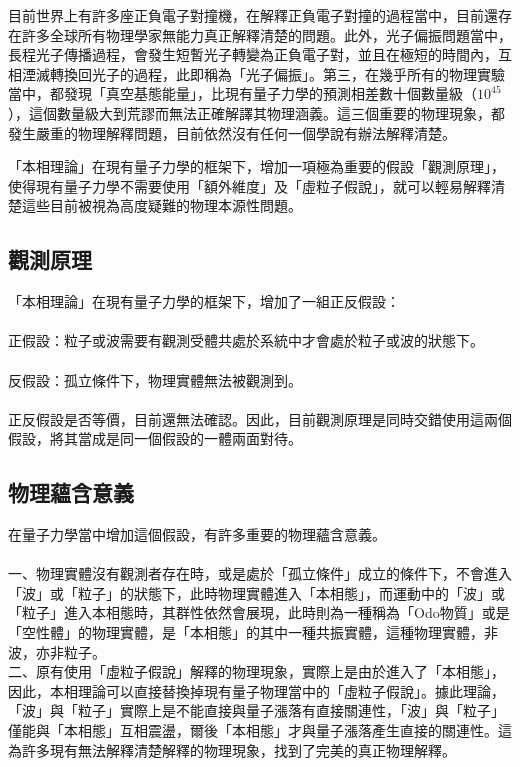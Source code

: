 \documentclass[a4paper,notitlepage,UTF8]{ctexart}
\begin{document}
目前世界上有許多座正負電子對撞機，在解釋正負電子對撞的過程當中，目前還存在許多全球所有物理學家無能力真正解釋清楚的問題。此外，光子偏振問題當中，長程光子傳播過程，會發生短暫光子轉變為正負電子對，並且在極短的時間內，互相湮滅轉換回光子的過程，此即稱為「光子偏振」。第三，在幾乎所有的物理實驗當中，都發現「真空基態能量」，比現有量子力學的預測相差數十個數量級（$10^{45}$），這個數量級大到荒謬而無法正確解譯其物理涵義。這三個重要的物理現象，都發生嚴重的物理解釋問題，目前依然沒有任何一個學說有辦法解釋清楚。

「本相理論」在現有量子力學的框架下，增加一項極為重要的假設「觀測原理」，使得現有量子力學不需要使用「額外維度」及「虛粒子假說」，就可以輕易解釋清楚這些目前被視為高度疑難的物理本源性問題。

\subsection{觀測原理}

「本相理論」在現有量子力學的框架下，增加了一組正反假設：
\\
\\
正假設：粒子或波需要有觀測受體共處於系統中才會處於粒子或波的狀態下。
\\
\\
反假設：孤立條件下，物理實體無法被觀測到。
\\
\\
正反假設是否等價，目前還無法確認。因此，目前觀測原理是同時交錯使用這兩個假設，將其當成是同一個假設的一體兩面對待。
\\

\subsection{物理蘊含意義}

在量子力學當中增加這個假設，有許多重要的物理蘊含意義。
\\
\\
一、物理實體沒有觀測者存在時，或是處於「孤立條件」成立的條件下，不會進入「波」或「粒子」的狀態下，此時物理實體進入「本相態」，而運動中的「波」或「粒子」進入本相態時，其群性依然會展現，此時則為一種稱為「Odo物質」或是「空性體」的物理實體，是「本相態」的其中一種共振實體，這種物理實體，非波，亦非粒子。
\\

二、原有使用「虛粒子假說」解釋的物理現象，實際上是由於進入了「本相態」，因此，本相理論可以直接替換掉現有量子物理當中的「虛粒子假說」。據此理論，「波」與「粒子」實際上是不能直接與量子漲落有直接關連性，「波」與「粒子」僅能與「本相態」互相震盪，爾後「本相態」才與量子漲落產生直接的關連性。這為許多現有無法解釋清楚解釋的物理現象，找到了完美的真正物理解釋。
\\
\end{document}
